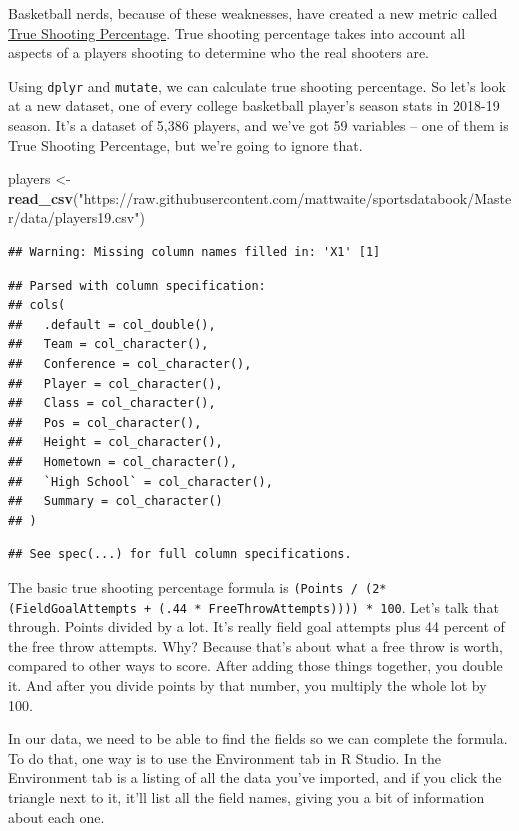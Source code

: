 \documentclass[]{book}
\newenvironment{Shaded}{\begin{snugshade}}{\end{snugshade}}
\newcommand{\KeywordTok}[1]{\textcolor[rgb]{0.13,0.29,0.53}{\textbf{#1}}}
\newcommand{\StringTok}[1]{\textcolor[rgb]{0.31,0.60,0.02}{#1}}
\newcommand{\NormalTok}[1]{#1}
\begin{document}
Basketball nerds, because of these weaknesses, have created a new metric
called
\href{https://en.wikipedia.org/wiki/True_shooting_percentage}{True
Shooting Percentage}. True shooting percentage takes into account all
aspects of a players shooting to determine who the real shooters are.

Using \texttt{dplyr} and \texttt{mutate}, we can calculate true shooting
percentage. So let's look at a new dataset, one of every college
basketball player's season stats in 2018-19 season. It's a dataset of
5,386 players, and we've got 59 variables -- one of them is True
Shooting Percentage, but we're going to ignore that.

\begin{Shaded}
\begin{Highlighting}[]
\NormalTok{players <-}\StringTok{ }\KeywordTok{read_csv}\NormalTok{(}\StringTok{"https://raw.githubusercontent.com/mattwaite/sportsdatabook/Master/data/players19.csv"}\NormalTok{)}
\end{Highlighting}
\end{Shaded}

\begin{verbatim}
## Warning: Missing column names filled in: 'X1' [1]
\end{verbatim}

\begin{verbatim}
## Parsed with column specification:
## cols(
##   .default = col_double(),
##   Team = col_character(),
##   Conference = col_character(),
##   Player = col_character(),
##   Class = col_character(),
##   Pos = col_character(),
##   Height = col_character(),
##   Hometown = col_character(),
##   `High School` = col_character(),
##   Summary = col_character()
## )
\end{verbatim}

\begin{verbatim}
## See spec(...) for full column specifications.
\end{verbatim}

The basic true shooting percentage formula is
\texttt{(Points\ /\ (2*(FieldGoalAttempts\ +\ (.44\ *\ FreeThrowAttempts))))\ *\ 100}.
Let's talk that through. Points divided by a lot. It's really field goal
attempts plus 44 percent of the free throw attempts. Why? Because that's
about what a free throw is worth, compared to other ways to score. After
adding those things together, you double it. And after you divide points
by that number, you multiply the whole lot by 100.

In our data, we need to be able to find the fields so we can complete
the formula. To do that, one way is to use the Environment tab in R
Studio. In the Environment tab is a listing of all the data you've
imported, and if you click the triangle next to it, it'll list all the
field names, giving you a bit of information about each one.
\end{document}
